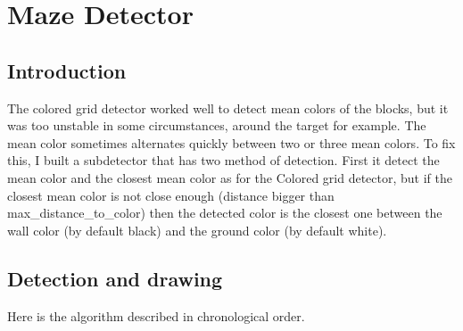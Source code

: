 \section{Maze Detector}
\label{sec:md}


\subsection{Introduction}
\label{sec:md:intro}

The colored grid detector worked well to detect mean colors of the blocks, 
but it was too unstable in some circumstances, around the target for 
example. The mean color sometimes alternates quickly between two or 
three mean colors. To fix this, I built a subdetector that has two 
method of detection. First it detect the mean color and the closest 
mean color as for the Colored grid detector, but if the closest mean 
color is not close enough (distance bigger than max\_distance\_to\_color) 
then the detected color is the closest one between the wall color (by 
default black) and the ground color (by default white).

\subsection{Detection and drawing}
\label{sec:md:algo}
Here is the algorithm described in chronological order.

